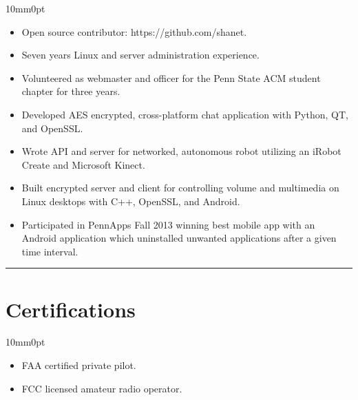 \documentclass[letterpaper]{article}
\newcommand{\sectionrule}[1] {
  \noindent\rule{\textwidth}{.1mm}
  \vspace{-11mm}
  \section{#1}
}
\newenvironment{indentsection}
  {\begin{adjustwidth}{10mm}{0pt}}
  {\end{adjustwidth}}
\begin{document}
  \begin{indentsection}
    \begin{itemize}
      \item Open source contributor: https://github.com/shanet.
      \item Seven years Linux and server administration experience.
      \item Volunteered as webmaster and officer for the Penn State ACM student chapter for three years.
      \item Developed AES encrypted, cross-platform chat application with Python, QT, and OpenSSL.
      \item Wrote API and server for networked, autonomous robot utilizing an iRobot Create and Microsoft Kinect.
      \item Built encrypted server and client for controlling volume and multimedia on Linux desktops with C++, OpenSSL, and Android.
      \item Participated in PennApps Fall 2013 winning best mobile app with an Android application which uninstalled unwanted applications after a given time interval.
    \end{itemize}
  \end{indentsection}

  \sectionrule{Certifications}

  \begin{indentsection}
    \begin{itemize}
      \item FAA certified private pilot.
      \item FCC licensed amateur radio operator.
    \end{itemize}
  \end{indentsection}
\end{document}
